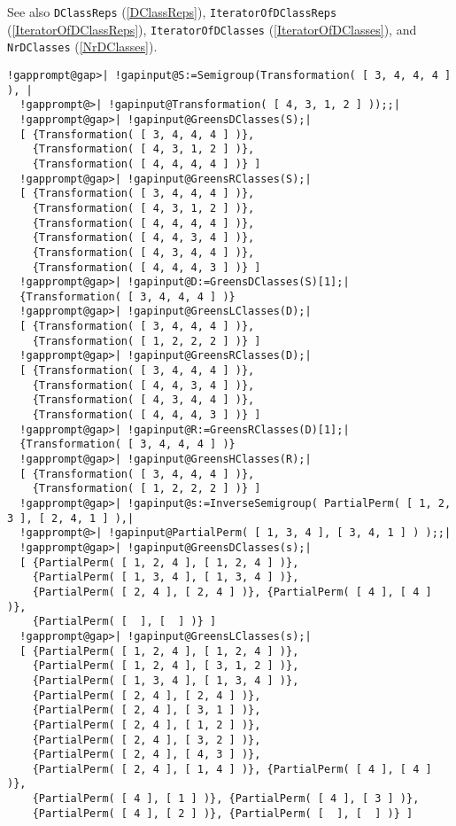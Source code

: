 \documentclass[a4paper,11pt]{report}
\begin{document}
{{{ See also \texttt{DClassReps} (\ref{DClassReps}), \texttt{IteratorOfDClassReps} (\ref{IteratorOfDClassReps}), \texttt{IteratorOfDClasses} (\ref{IteratorOfDClasses}), and \texttt{NrDClasses} (\ref{NrDClasses}). 
\begin{Verbatim}[commandchars=!@|,fontsize=\small,frame=single,label=Example]
  !gapprompt@gap>| !gapinput@S:=Semigroup(Transformation( [ 3, 4, 4, 4 ] ), |
  !gapprompt@>| !gapinput@Transformation( [ 4, 3, 1, 2 ] ));;|
  !gapprompt@gap>| !gapinput@GreensDClasses(S);|
  [ {Transformation( [ 3, 4, 4, 4 ] )}, 
    {Transformation( [ 4, 3, 1, 2 ] )}, 
    {Transformation( [ 4, 4, 4, 4 ] )} ]
  !gapprompt@gap>| !gapinput@GreensRClasses(S);|
  [ {Transformation( [ 3, 4, 4, 4 ] )}, 
    {Transformation( [ 4, 3, 1, 2 ] )}, 
    {Transformation( [ 4, 4, 4, 4 ] )}, 
    {Transformation( [ 4, 4, 3, 4 ] )}, 
    {Transformation( [ 4, 3, 4, 4 ] )}, 
    {Transformation( [ 4, 4, 4, 3 ] )} ]
  !gapprompt@gap>| !gapinput@D:=GreensDClasses(S)[1];|
  {Transformation( [ 3, 4, 4, 4 ] )}
  !gapprompt@gap>| !gapinput@GreensLClasses(D);|
  [ {Transformation( [ 3, 4, 4, 4 ] )}, 
    {Transformation( [ 1, 2, 2, 2 ] )} ]
  !gapprompt@gap>| !gapinput@GreensRClasses(D);|
  [ {Transformation( [ 3, 4, 4, 4 ] )}, 
    {Transformation( [ 4, 4, 3, 4 ] )}, 
    {Transformation( [ 4, 3, 4, 4 ] )}, 
    {Transformation( [ 4, 4, 4, 3 ] )} ]
  !gapprompt@gap>| !gapinput@R:=GreensRClasses(D)[1];|
  {Transformation( [ 3, 4, 4, 4 ] )}
  !gapprompt@gap>| !gapinput@GreensHClasses(R);|
  [ {Transformation( [ 3, 4, 4, 4 ] )}, 
    {Transformation( [ 1, 2, 2, 2 ] )} ]
  !gapprompt@gap>| !gapinput@s:=InverseSemigroup( PartialPerm( [ 1, 2, 3 ], [ 2, 4, 1 ] ),|
  !gapprompt@>| !gapinput@PartialPerm( [ 1, 3, 4 ], [ 3, 4, 1 ] ) );;|
  !gapprompt@gap>| !gapinput@GreensDClasses(s);|
  [ {PartialPerm( [ 1, 2, 4 ], [ 1, 2, 4 ] )}, 
    {PartialPerm( [ 1, 3, 4 ], [ 1, 3, 4 ] )}, 
    {PartialPerm( [ 2, 4 ], [ 2, 4 ] )}, {PartialPerm( [ 4 ], [ 4 ] )}, 
    {PartialPerm( [  ], [  ] )} ]
  !gapprompt@gap>| !gapinput@GreensLClasses(s);|
  [ {PartialPerm( [ 1, 2, 4 ], [ 1, 2, 4 ] )}, 
    {PartialPerm( [ 1, 2, 4 ], [ 3, 1, 2 ] )}, 
    {PartialPerm( [ 1, 3, 4 ], [ 1, 3, 4 ] )}, 
    {PartialPerm( [ 2, 4 ], [ 2, 4 ] )}, 
    {PartialPerm( [ 2, 4 ], [ 3, 1 ] )}, 
    {PartialPerm( [ 2, 4 ], [ 1, 2 ] )}, 
    {PartialPerm( [ 2, 4 ], [ 3, 2 ] )}, 
    {PartialPerm( [ 2, 4 ], [ 4, 3 ] )}, 
    {PartialPerm( [ 2, 4 ], [ 1, 4 ] )}, {PartialPerm( [ 4 ], [ 4 ] )}, 
    {PartialPerm( [ 4 ], [ 1 ] )}, {PartialPerm( [ 4 ], [ 3 ] )}, 
    {PartialPerm( [ 4 ], [ 2 ] )}, {PartialPerm( [  ], [  ] )} ]

\end{Verbatim}}}}
\end{document}
